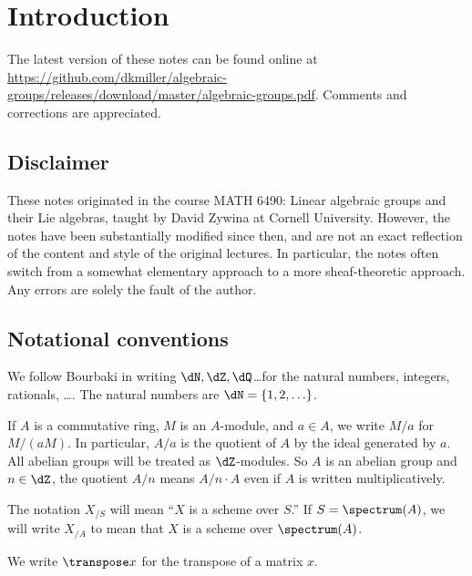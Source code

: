 
\section{Introduction}





The latest version of these notes can be found online at 
\url{https://github.com/dkmiller/algebraic-groups/releases/download/master/algebraic-groups.pdf}. 
Comments and corrections are appreciated. 





\subsection{Disclaimer}

These notes originated in the course MATH 6490: Linear algebraic groups and 
their Lie algebras, taught by David Zywina at Cornell University. However, the 
notes have been substantially modified since then, and are not an exact 
reflection of the content and style of the original lectures. In particular, 
the notes often switch from a somewhat elementary approach to a more 
sheaf-theoretic approach. Any errors are solely the fault of the author. 





\subsection{Notational conventions}

We follow Bourbaki in writing $\dN,\dZ,\dQ$\ldots for the natural numbers, 
integers, rationals, \ldots. The natural numbers are $\dN=\{1,2,\ldots\}$. 

If $A$ is a commutative ring, $M$ is an $A$-module, and $a\in A$, 
we write $M/a$ for $M/(a M)$. In particular, $A/a$ is the quotient of $A$ by 
the ideal generated by $a$. All abelian groups will be treated as 
$\dZ$-modules. So $A$ is an abelian group and $n\in \dZ$, the quotient 
$A/n$ means $A/n\cdot A$ even if $A$ is written multiplicatively. 

The notation $X_{/S}$ will mean ``$X$ is a scheme over $S$.'' If 
$S=\spectrum(A)$, we will write $X_{/A}$ to mean that $X$ is a scheme over 
$\spectrum(A)$. 

We write $\transpose x$ for the transpose of a matrix $x$. 

